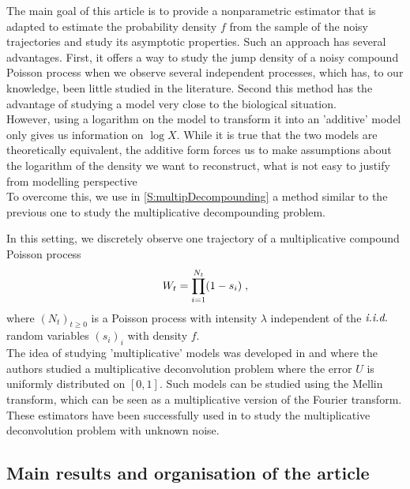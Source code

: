 The main goal of this article is to provide a nonparametric estimator that is adapted to estimate the probability density $f$ from the sample of the noisy trajectories and study its asymptotic properties. Such an approach has several advantages. First, it offers a way to study the jump density of a noisy compound Poisson process when we observe several independent processes, which has, to our knowledge, been little studied in the literature. Second this method has the advantage of studying a model very close to the biological situation. \\

However, using a logarithm on the model to transform it into an 'additive' model only gives us information on $\log X$. While it is true that the two models are theoretically equivalent, the additive form forces us to make assumptions about the logarithm of the density we want to reconstruct, what is not easy to justify from modelling perspective \\
To overcome this, we use in \cref{S:multipDecompounding} a method similar to the previous one to study the multiplicative decompounding problem. 

In this setting, we discretely observe one trajectory of a multiplicative compound Poisson process 
    \begin{equation*}
    W_t =\prod_{i = 1}^{N_t}(1 - s_i) 
    \; ,
    \end{equation*}
where $(N_t)_{t \geq 0}$ is a Poisson process with intensity $\lambda$ independent of the $\textit{i.i.d.}\;$ random variables $(s_i)_i$ with density $f$. \\

The idea of studying 'multiplicative' models was developed in \cite{vardi1989multiplicative} and \cite{vardi1992large} where the authors studied a multiplicative deconvolution problem where the error $U$ is uniformly distributed on $[0,1]$. Such models can be studied using the Mellin transform, which can be seen as a multiplicative version of the Fourier transform. These estimators have been successfully used in  \cite{miguel2021spectral,miguel2023multiplicative} to study the multiplicative deconvolution problem with unknown noise.


\subsection{Main results and organisation of the article}


